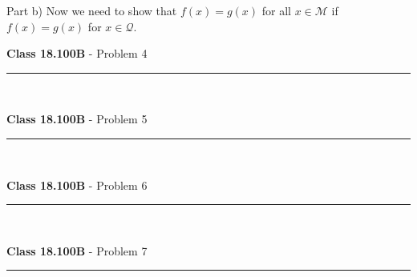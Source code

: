 \documentclass[11pt,reqno]{article}
\begin{document}
\noindent Part b) Now we need to show that $f(x) = g(x)$ for all $x \in \mathcal{M}$ if $f(x) = g(x)$ for $x \in \mathcal{Q}$.

\vspace{15pt}
\begin{flushleft} 
\textbf{Class 18.100B} - Problem 4\\
\rule{500pt}{1pt}\\
\end{flushleft} 


\vspace{15pt}
\begin{flushleft} 
\textbf{Class 18.100B} - Problem 5\\
\rule{500pt}{1pt}\\
\end{flushleft} 


\vspace{15pt}
\begin{flushleft} 
\textbf{Class 18.100B} - Problem 6\\
\rule{500pt}{1pt}\\
\end{flushleft} 


\vspace{15pt}
\begin{flushleft} 
\textbf{Class 18.100B} - Problem 7\\
\rule{500pt}{1pt}\\
\end{flushleft} 


\end{document}
